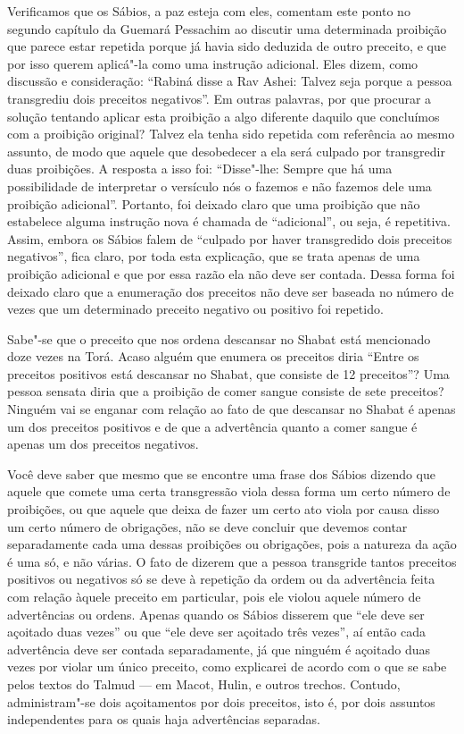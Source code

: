 Verificamos que os Sábios, a paz esteja com eles, comentam este ponto
no segundo capítulo da Guemará\starr{} Pessachim\starr{} ao discutir uma determinada
proibição que parece estar repetida porque já havia sido deduzida de
outro preceito, e que por isso querem aplicá"-la como uma instrução
adicional. Eles dizem, como discussão e consideração: ``Rabiná\starr{} disse a
Rav Ashei: Talvez seja porque a pessoa transgrediu dois preceitos
negativos''. Em outras palavras, por que procurar a solução tentando
aplicar esta proibição a algo diferente daquilo que concluímos com a
proibição original? Talvez ela tenha sido repetida com referência ao
mesmo assunto, de modo que aquele que desobedecer a ela será culpado por
transgredir duas proibições. A resposta a isso foi: ``Disse"-lhe: Sempre
que há uma possibilidade de interpretar o versículo nós o fazemos e não
fazemos dele uma proibição adicional''. Portanto, foi deixado claro que
uma proibição que não estabelece alguma instrução nova é chamada de
``adicional'', ou seja, é repetitiva. Assim, embora os Sábios falem de
``culpado por haver transgredido dois preceitos negativos'', fica
claro, por toda esta explicação, que se trata apenas de uma proibição
adicional e que por essa razão ela não deve ser contada. Dessa forma
foi deixado claro que a enumeração dos preceitos não deve ser baseada no
número de vezes que um determinado preceito negativo ou positivo foi
repetido.

Sabe"-se que o preceito que nos ordena descansar no Shabat está
mencionado doze vezes na Torá\starr. Acaso alguém que enumera os preceitos
diria ``Entre os preceitos positivos está descansar no Shabat, que
consiste de 12 preceitos''? Uma pessoa sensata diria que a proibição de comer sangue
consiste de sete preceitos? Ninguém vai se enganar com relação ao fato
de que descansar no Shabat é apenas um dos preceitos positivos e de que
a advertência quanto a comer sangue é apenas um dos preceitos
negativos.

Você deve saber que mesmo que se encontre uma frase dos Sábios dizendo
que aquele que comete uma certa transgressão viola dessa forma um certo
número de proibições, ou que aquele que deixa de fazer um certo ato
viola por causa disso um certo número de obrigações, não se deve
concluir que devemos contar separadamente cada uma dessas proibições ou
obrigações, pois a natureza da ação é uma só, e não várias. O fato de
dizerem que a pessoa transgride tantos preceitos positivos ou negativos
só se deve à repetição da ordem ou da advertência feita com relação
àquele preceito em particular, pois ele violou aquele número de
advertências ou ordens. Apenas quando os Sábios disserem que ``ele deve
ser açoitado duas vezes'' ou que ``ele deve ser açoitado três vezes'',
aí então cada advertência deve ser contada separadamente, já que ninguém
é açoitado duas vezes por violar um único preceito, como explicarei de
acordo com o que se sabe pelos textos do Talmud\starr{} --- em Macot\starr, Hulin\starr, e
outros trechos. Contudo, administram"-se dois açoitamentos por dois
preceitos, isto é, por dois assuntos independentes para os quais haja
advertências separadas.


